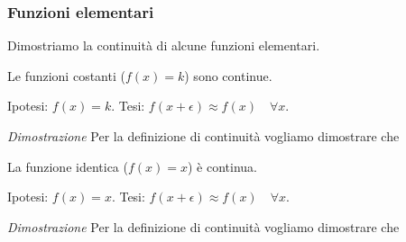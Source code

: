 \subsubsection{Funzioni elementari}
\label{subsubsec:cont_funzionielementari}

Dimostriamo la continuità di alcune funzioni elementari.

\begin{teorema}
Le funzioni costanti (\(f(x) = k\)) sono continue.
\end{teorema}

Ipotesi: \(f(x)=k\).\tab 
Tesi: \(f(x+\epsilon) \approx f(x) \quad \forall x\).


\noindent \emph{Dimostrazione}
Per la definizione di continuità vogliamo dimostrare che 


\begin{teorema}
La funzione identica (\(f(x) = x\)) è continua.
\end{teorema}

\noindent Ipotesi: \(f(x)=x\).\tab 
Tesi: \(f(x+\epsilon) \approx f(x) \quad \forall x\).

\emph{Dimostrazione}
Per la definizione di continuità vogliamo dimostrare che 


\newcommand{\overbow}[1]{
   \tikz [baseline = (N.base), every node/.style={}] {
      \node [inner sep = 0pt] (N) {$#1$};
      \draw [line width = 0.4pt] plot [smooth, tension=1.3] coordinates {
         ($(N.north west) + (0.1ex,0)$)
         ($(N.north)      + (0,0.5ex)$)
         ($(N.north east) + (0,0)$)
      };
   }
}

